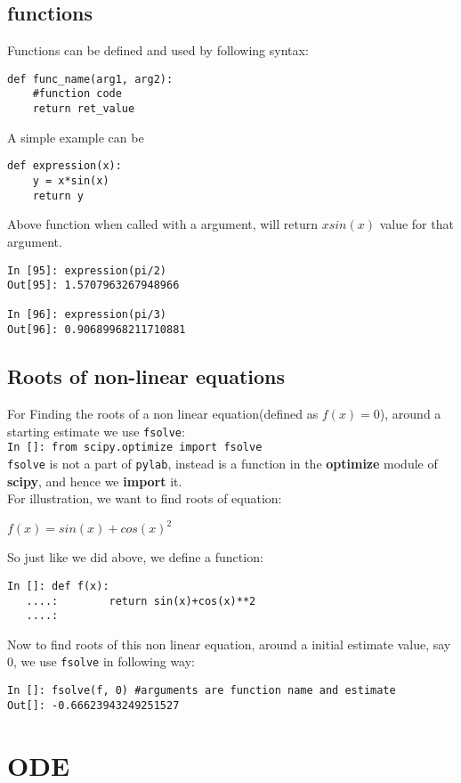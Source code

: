 \documentclass[12pt]{article}
\newcommand{\typ}[1]{\lstinline{#1}}
\begin{document}
\subsection{functions}
Functions can be defined and used by following syntax:
\begin{lstlisting}
def func_name(arg1, arg2):
    #function code
    return ret_value
\end{lstlisting}
A simple example can be
\begin{lstlisting}
def expression(x):
    y = x*sin(x)
    return y
\end{lstlisting}
Above function when called with a argument, will return $xsin(x)$ value for that argument.
\begin{lstlisting}
In [95]: expression(pi/2)
Out[95]: 1.5707963267948966

In [96]: expression(pi/3)
Out[96]: 0.90689968211710881
\end{lstlisting}
\subsection{Roots of non-linear equations}
For Finding the roots of a non linear equation(defined as $f(x)=0$), around a starting estimate we use \typ{fsolve}:\\
\typ{In []: from scipy.optimize import fsolve}\\
\typ{fsolve} is not a part of \typ{pylab}, instead is a function in the \textbf{optimize} module of \textbf{scipy}, and hence we \textbf{import} it.\\
For illustration, we want to find roots of equation:
\begin{center}
  $f(x)=sin(x)+cos(x)^2$
\end{center}
So just like we did above, we define a function:
\begin{lstlisting}
In []: def f(x):
   ....:        return sin(x)+cos(x)**2
   ....: 
\end{lstlisting}
Now to find roots of this non linear equation, around a initial estimate value, say 0, we use \typ{fsolve} in following way:
\begin{lstlisting}
In []: fsolve(f, 0) #arguments are function name and estimate
Out[]: -0.66623943249251527
\end{lstlisting}

\section{ODE}
\end{document}
